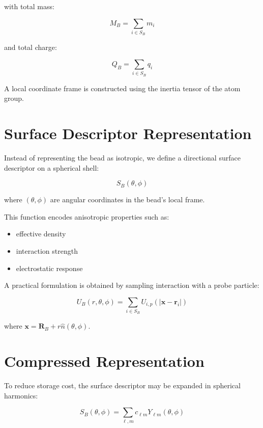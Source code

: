 \documentclass[11pt]{article}
\begin{document}
with total mass:

\begin{equation}
M_B = \sum_{i \in S_B} m_i
\end{equation}

and total charge:

\begin{equation}
Q_B = \sum_{i \in S_B} q_i
\end{equation}

A local coordinate frame is constructed using the inertia tensor of the atom group.

\section{Surface Descriptor Representation}

Instead of representing the bead as isotropic, we define a directional surface descriptor on a spherical shell:

\begin{equation}
S_B(\theta, \phi)
\end{equation}

where $(\theta, \phi)$ are angular coordinates in the bead's local frame.

This function encodes anisotropic properties such as:
\begin{itemize}
    \item effective density
    \item interaction strength
    \item electrostatic response
\end{itemize}

A practical formulation is obtained by sampling interaction with a probe particle:

\begin{equation}
U_B(r, \theta, \phi) = \sum_{i \in S_B} U_{i,p}(|\mathbf{x} - \mathbf{r}_i|)
\end{equation}

where $\mathbf{x} = \mathbf{R}_B + r \hat{n}(\theta, \phi)$.

\section{Compressed Representation}

To reduce storage cost, the surface descriptor may be expanded in spherical harmonics:

\begin{equation}
S_B(\theta, \phi) = \sum_{\ell,m} c_{\ell m} Y_{\ell m}(\theta, \phi)
\end{equation}
\end{document}
